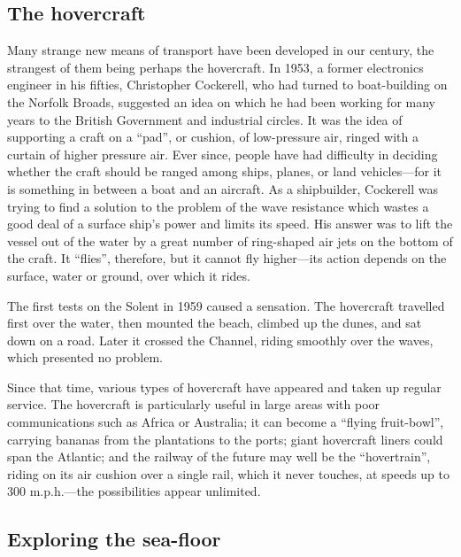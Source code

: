 \documentclass[11pt]{article}
\begin{document}
\subsection{The hovercraft}
\label{sec-2-29}

Many strange new means of transport have been developed in our century, the strangest of them being perhaps the hovercraft. In 1953, a former electronics engineer in his fifties, Christopher Cockerell, who had turned to boat-building on the Norfolk Broads, suggested an idea on which he had been working for many years to the British Government and industrial circles. It was the idea of supporting a craft on a ``pad'', or cushion, of low-pressure air, ringed with a curtain of higher pressure air. Ever since, people have had difficulty in deciding whether the craft should be ranged among ships, planes, or land vehicles---for it is something in between a boat and an aircraft. As a shipbuilder, Cockerell was trying to find a solution to the problem of the wave resistance which wastes a good deal of a surface ship's power and limits its speed. His answer was to lift the vessel out of the water by a great number of ring-shaped air jets on the bottom of the craft. It ``flies'', therefore, but it cannot fly higher---its action depends on the surface, water or ground, over which it rides.

The first tests on the Solent in 1959 caused a sensation. The hovercraft travelled first over the water, then mounted the beach, climbed up the dunes, and sat down on a road. Later it crossed the Channel, riding smoothly over the waves, which presented no problem.

Since that time, various types of hovercraft have appeared and taken up regular service. The hovercraft is particularly useful in large areas with poor communications such as Africa or Australia; it can become a ``flying fruit-bowl'', carrying bananas from the plantations to the ports; giant hovercraft liners could span the Atlantic; and the railway of the future may well be the ``hovertrain'', riding on its air cushion over a single rail, which it never touches, at speeds up to 300 m.p.h.---the possibilities appear unlimited.
\subsection{Exploring the sea-floor}
\label{sec-2-30}
\end{document}
